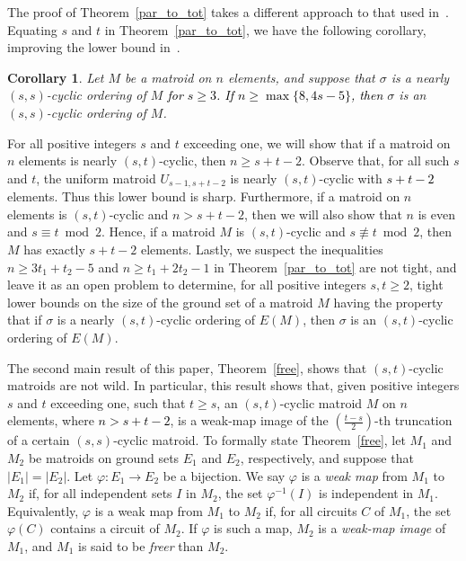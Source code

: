 \documentclass[11pt]{amsart}
\newtheorem{corollary}[theorem]{Corollary}
\newcommand{\blue}{\textcolor{black}}
\newcommand{\bloo}{\textcolor{black}}
\begin{document}

\noindent The proof of Theorem~\ref{par_to_tot} takes a different approach to that used in~\cite{bre19b}. Equating $s$ and $t$ in Theorem~\ref{par_to_tot}, we have the following corollary, improving the lower bound in~\cite[Theorem~1.1]{bre19b}.

\begin{corollary}
Let $M$ be a matroid on $n$ elements, and suppose that $\sigma$ is a nearly $(s, s)$-cyclic ordering of $M$ \blue{for $s\ge 3$. If $n \geq \max\{8, 4s-5\}$, then} $\sigma$ is an $(s, s)$-cyclic ordering of $M$.
\end{corollary}


For all positive integers $s$ and $t$ exceeding one, we will show that if a matroid on $n$ elements is nearly $(s, t)$-cyclic, then $n\ge s+t-2$. Observe that, for all such $s$ and $t$, the uniform matroid $U_{s-1, s+t-2}$ is nearly $(s, t)$-cyclic with \blue{$s+t-2$} elements. Thus this lower bound is sharp. Furthermore, if a matroid on $n$ elements is $(s, t)$-cyclic and $n>s+t-2$, then we will also show that $n$ is even and $s\equiv t\bmod{2}$. Hence, if a matroid $M$ is $(s, t)$-cyclic and $s\not\equiv t\bmod{2}$, then $M$ has exactly $s+t-2$ elements. Lastly, we suspect the inequalities $n\ge 3t_1+t_2-5$ and $n\ge t_1+2t_2-1$ in Theorem~\ref{par_to_tot} are
not tight, and leave it as an open problem to determine, for all positive integers $s, t\ge 2$, tight lower bounds on the size of the ground set of a matroid $M$ having the property that if $\sigma$ is a nearly $(s, t)$-cyclic ordering of $E(M)$, then $\sigma$ is an $(s, t)$-cyclic ordering of $E(M)$.

The second main result of this paper, Theorem~\ref{free}, shows that $(s, t)$-cyclic matroids are not wild. In particular, this result shows that, given positive integers $s$ and $t$ exceeding one, such that $t\ge s$, an $(s, t)$-cyclic matroid $M$ on $n$ elements, where \bloo{$n > s+t-2$}, is a weak-map image of the $\left(\frac{t-s}{2}\right)$-th truncation of a certain $(s, s)$-cyclic matroid. To formally state Theorem~\ref{free}, let $M_1$ and $M_2$ be matroids on ground sets $E_1$ and $E_2$, respectively, and suppose that $|E_1|=|E_2|$. Let $\varphi:E_1\rightarrow E_2$ be a bijection. We say $\varphi$ is a {\em weak map} from $M_1$ to $M_2$ if, for all independent sets $I$ in $M_2$, the set $\varphi^{-1}(I)$ is independent in $M_1$. Equivalently, $\varphi$ is a weak map from $M_1$ to $M_2$ if, for all circuits $C$ of $M_1$, the set $\varphi(C)$ contains a circuit of $M_2$. If $\varphi$ is such a map, $M_2$ is a {\em weak-map image} of $M_1$, and $M_1$ is said to be {\em freer} than $M_2$.
\end{document}
